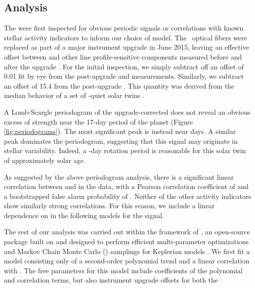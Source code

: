 \documentclass[modern]{aastex62}
\begin{document}
\subsection{\RV Analysis}
\label{s:analysis:rvs}

The \RVs were first inspected for obvious periodic signals or correlations with known stellar activity indicators to inform our choice of model. 
The \HARPS\ optical fibers were replaced as part of a major instrument upgrade in June 2015, leaving an effective offset between \RVs and other line profile-sensitive components measured before and after the upgrade \citep{Lovis15}. 
For the initial inspection, we simply subtract off an offset of 0.01 fit by eye from the post-upgrade \BIS and \FWHM measurements. 
Similarly, we subtract an offset of 15.4 \ms from the post-upgrade \RVs. This quantity was derived from the median behavior of a set of \RV-quiet solar twins \citep{Melendez17}.


A Lomb-Scargle periodogram of the upgrade-corrected \RVs does not reveal an obvious excess of strength near the 17-day period of the \TESS planet (Figure \ref{fig:periodograms}). 
The most significant peak is instead near  days. 
A similar peak dominates the \FWHM periodogram, suggesting that this signal may originate in stellar variability. 
Indeed, a -day rotation period is reasonable for this solar twin of approximately solar age.

As suggested by the above periodogram analysis, there is a significant linear correlation between \RV and \FWHM in the data, with a Pearson correlation coefficient of  and a bootstrapped false alarm probability of . 
Neither of the other activity indicators show similarly strong correlations. 
For this reason, we include a linear dependence on \FWHM in the following models for the \RV signal.

The rest of our analysis was carried out within the framework of \exoplanet, an open-source \python package built on \pymc and designed to perform efficient multi-parameter optimizations and Markov Chain Monte Carlo (\mcmc) samplings for Keplerian models \citep{exoplanet}. 
We first fit a model consisting only of a second-order polynomial \RV trend and a linear correlation with \FWHM. 
The free parameters for this model include coefficients of the polynomial and correlation terms, but also instrument upgrade offsets for both the \RVs 
\end{document}
